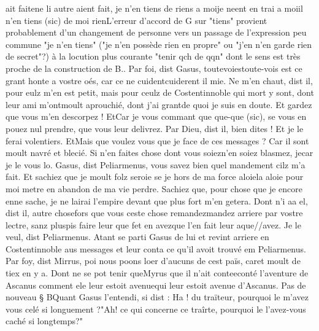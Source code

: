 \documentclass{article}
\begin{document}
\begin{pages}
                     ait faitene li autre aient fait, 
                     je n’en tiens de riens a moije neent en trai a moiil n'en tiens (sic) de moi rienL'erreur d'accord de G sur "tiens" provient
                     probablement d'un changement de personne vers un passage de l'expression peu
                     commune "je n'en tiens" ("je n'en possède rien en propre" ou "j'en n'en garde
                     rien de secret"?) à la locution plus courante "tenir qch de qqn" dont le sens
                     est très proche de la construction de B..
               Par foi, dist Gasus, 
                     toutevoiestoute-vois est ce grant honte a vostre oés, car ce ne 
                     cuidentcuiderent il mie.
               Ne m’en chaut, dist il, pour eulz m’en est petit,
                  mais pour ceulz de Costentinnoble qui
                  mort y sont, dont leur ami 
                     m'ontmoult aprouchié, 
                     dont j’ai grantde quoi je suis en doute. Et gardez que vous m’en descorpez ! 
                     EtCar je vous commant 
                     que
                     que-que (sic), se vous en pouez nul prendre, que vous leur delivrez.
               Par Dieu, dist il, bien dites ! Et je le ferai
                  volentiers. 
                     EtMais que voulez vous que je face de ces messages ? Car il sont moult navré et
                  blecié. Si n’en faites chose dont vous 
                     soiezn'en soiez blasmez, 
                     jecar je le vous lo.
               Gasus, dist
                     Peliarmenus, vous savez bien quel
                  mandement cilz m’a fait. Et sachiez que je moult folz seroie se je hors de ma
                  force 
                     aloiela aloie pour moi metre en abandon de ma vie perdre. Sachiez que, pour
                  chose que je encore 
                     enne sache, je ne lairai l’empire devant que plus fort m’en getera.
               Dont n'i
                     aa el, dist il, 
                     autre chosefors que vous ceste chose 
                     remandezmandez arriere par vostre lectre, sanz 
                     pluspis faire leur 
                     que fet en avezque l'en fait leur aque//avez.
               Je le veul, dist Peliarmenus. Atant se parti Gasus de
               lui et revint 
                  arriere en Costentinnoble aus messages et
               leur conta ce qu’il avoit trouvé em Peliarmenus. Par foy, dist Mirrus, poi nous poons loer d’aucuns de cest païs, 
                     caret moult de tiex en y a. Dont ne se pot tenir 
                  queMyrus que il n’ait 
                  conteeconté l’aventure 
                  de Ascanus comment ele
                     leur estoit avenuequi leur estoit avenue d'Ascanus. \pend
            \pstart Pas de nouveau § BQuant
                  Gasus l’entendi, si dist : Ha ! du traïteur, pourquoi le m’avez vous celé si longuement
                  ?"Ah! ce qui concerne ce traîrte, pourquoi le
                  l'avez-vous caché si longtemps?"
               

\end{pages}
\end{document}
